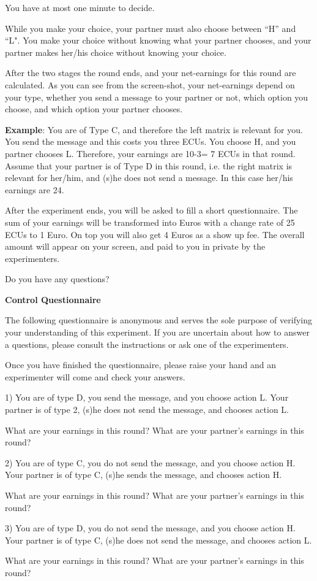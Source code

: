 \documentclass[12pt]{article}
\theoremstyle{break}
\begin{document}
You have at most one minute to decide.

While you make your choice, your partner must also choose between ``H'' and ``L". You make your choice without knowing what your partner chooses, and your partner makes her/his choice without knowing your choice. 

After the two stages the round ends, and your net-earnings for this round are calculated. As you can see from the screen-shot, your net-earnings depend on your type, whether you send a message to your partner or not, which option you choose, and which option your partner chooses. 

\textbf{Example}: You are of Type C, and therefore the left matrix is relevant for you. You send the message and this costs you three ECUs. You choose H, and you partner chooses L. Therefore, your earnings are 10-3= 7 ECUs in that round. Assume that your partner is of Type D in this round, i.e. the right matrix is relevant for her/him, and (s)he does not send a message. In this case her/his earnings are 24. 

After the experiment ends, you will be asked to fill a short questionnaire. The sum of your earnings will be transformed into Euros with a change rate of 25 ECUs to 1 Euro. On top you will also get 4 Euros as a show up fee. The overall amount will appear on your screen, and paid to you in private by the experimenters. 

Do you have any questions? 

\textbf{Control Questionnaire}

The following questionnaire is anonymous and serves the sole purpose of verifying your understanding of this experiment. If you are uncertain about how to answer a questions, please consult the instructions or ask one of the experimenters.

Once you have finished the questionnaire, please raise your hand and an experimenter will come and check your answers.

1) You are of type D, you send the message, and you choose action L. Your partner is of type 2, (s)he does not send the message, and chooses action L.

What are your earnings in this round?
What are your partner’s earnings in this round?

2) You are of type C, you do not send the message, and you choose action H. Your partner is of type C, (s)he sends the message, and chooses action H.

What are your earnings in this round?
What are your partner’s earnings in this round?


3) You are of type D, you do not send the message, and you choose action H. Your partner is of type C, (s)he does not send the message, and chooses action L.

What are your earnings in this round?
What are your partner’s earnings in this round?










\end{document}
